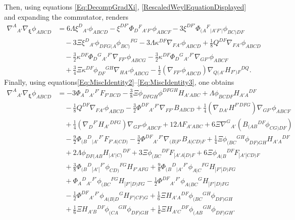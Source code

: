 \documentclass[10pt,a4paper]{article}
\theoremstyle{plain}
\begin{document}
Then, using equations \eqref{Eq:DecompGradXi},
\eqref{RescaledWeylEquationDisplayed}
and expanding the commutator, renders
\begin{align*}
\nabla^A{}_{A'}\nabla_{\bm\xi}\phi_{ABCD} & = 6 \Lambda \xi^{D}{}_{A'} \phi_{ABCD} -  \xi^{DF'} \Phi_{D}{}^{F}{}_{A'F'} \phi_{ABCF} -  3\xi^{DF'} \Phi_{(A}{}^{F}{}_{\vert A'F'\vert} \phi_{BC)DF}  \nonumber\\
    &\quad -  3\Xi\xi^{D}{}_{A'}  \phi_{DFG(A} \phi_{BC)}{}^{FG} - 3\Lambda \kappa^{DF} \nabla_{FA'}\phi_{ABCD} + \tfrac{1}{8} Q^{DF} \nabla_{FA'}\phi_{ABCD}  \nonumber\\ 
    &\quad -  \tfrac{3}{2} \kappa^{DF} \Phi_{D}{}^{G}{}_{A'}{}^{F'} \nabla_{FF'}\phi_{ABCG} -  \tfrac{3}{2} \kappa^{DF} \Phi_{D}{}^{G}{}_{A'}{}^{F'} \nabla_{GF'}\phi_{ABCF} \nonumber\\
    &\quad + \tfrac{3}{4} \Xi \kappa^{DF} \phi_{DF}{}^{GH} \nabla_{HA'}\phi_{ABCG} - \tfrac{1}{2}( \nabla_{FF'}\phi_{ABCD}) \nabla_{Q(A'}H_{F')F}{}^{DQ}.
\end{align*}
Finally, using equations\eqref{Eq:MiscIdentity2}--\eqref{Eq:MiscIdentity3}, one obtains
\begin{align}
\nabla^A{}_{A'}\nabla_{\bm\xi}\phi_{ABCD}  &= -3 \Phi _{A}{}^{D}{}_{A'}{}^{F'} F_{F'BCD}  - \tfrac{3}{8} \Xi  \phi _{DFGH} \phi ^{DFGH} H_{A'ABC} + \Lambda  \phi _{BCDF} H_{A'A}{}^{DF} \nonumber\\ 
    & \quad- \tfrac{1}{8} Q^{DF} \nabla_{FA'}\phi _{ABCD}   - \tfrac{3}{2} \Phi ^{DF}{}_{A'}{}^{F'} \nabla_{FF'}B_{ABCD} + \tfrac{1}{4} (\nabla_{DA'}H^{F'DFG}) \nabla_{GF'}\phi _{ABCF} \nonumber\\
    &\quad + \tfrac{1}{4} (\nabla_{D}{}^{F'}H_{A'}{}^{DFG}) \nabla_{GF'}\phi _{ABCF}  + 12 \Lambda  F_{A'ABC} +6\Xi \nabla^G{}_{A'}\left( B_{(AB}{}^{DF}\phi_{CG)DF}\right) \nonumber \\
    &\quad - \tfrac{9}{2} \Phi _{(B}{}^{D}{}_{|A'}{}^{F'}F_{F'A|CD)}  - \tfrac{3}{2} \Phi ^{DF}{}_{A'}{}^{F'}\nabla_{(B|F'}B_{A|CD)F} + \tfrac{1}{4} \Xi  \phi _{(BC}{}^{GH}\phi _{DF)GH} H_{A'A}{}^{DF}  \nonumber\\
    &\quad+ 2 \Lambda  \phi_{DF(AB}H_{\vert A'\vert C)}{}^{DF}+ 3 \Xi  \phi _{(BC}{}^{DF}F_{|A'A|D)F} + 6 \Xi  \phi _{A(B}{}^{DF}F_{|A'|CD)F} \nonumber \\
    &\quad  + \tfrac{3}{8} \Phi _{(B}{}^{D}{}_{|A'|}{}^{F'}\phi _{CD)}{}^{FG}H_{F'AFG} + \tfrac{9}{8} \Phi _{(B}{}^{D}{}_{|A'}{}^{F'}\phi _{A|C}{}^{FG}H_{|F'|D)FG} \nonumber\\
    &\quad + \Phi _{A}{}^{D}{}_{A'}{}^{F'}\phi _{(BC}{}^{FG}H_{|F'|D)FG}  - \tfrac{1}{2} \Phi ^{DF}{}_{A'}{}^{F'}\phi _{A(BC}{}^{G}H_{|F'|D)FG} \nonumber \\
    &\quad  - \tfrac{1}{2} \Phi ^{DF}{}_{A'}{}^{F'}\phi _{A(B|D}{}^{G}H_{F'|CF)G}+ \tfrac{1}{6}\Xi H_{A'A}{}^{DF}\phi_{(BC}{}^{GH}\phi_{DF)GH} \nonumber\\
    &\quad + \tfrac{1}{6}\Xi H_{A'B}{}^{DF}\phi_{(CA}{}^{GH}\phi_{DF)GH} + \tfrac{1}{6}\Xi H_{A'C}{}^{DF}\phi_{(AB}{}^{GH}\phi_{DF)GH}. \label{Eq:CollineationIdentity}
\end{align}
\end{document}
